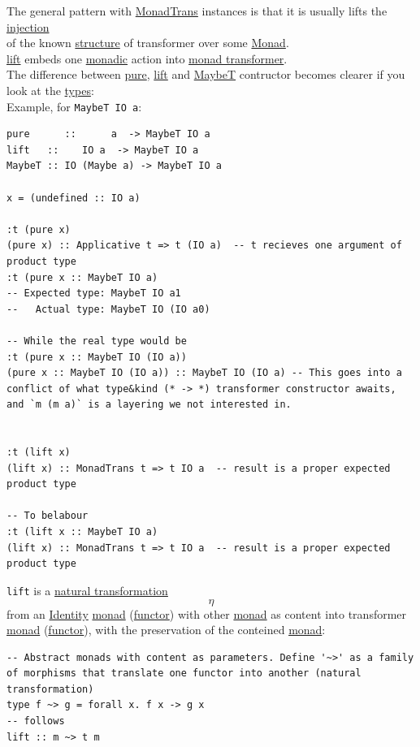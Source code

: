 \documentclass[11pt]{article}
\begin{document}
\begin{enumerate}
\begin{enumerate}
The general pattern with \hyperref[orge3b9a95]{MonadTrans} instances is that it is usually lifts the \hyperref[org50a8f52]{injection}\\
of the known \hyperref[org8051f61]{structure} of transformer over some \hyperref[org86a5d95]{Monad}.\\

\hyperref[org47dee33]{lift} embeds one \hyperref[orgad51197]{monadic} action into \hyperref[orgf5e357d]{monad transformer}.\\

The difference between \hyperref[org1bf8e16]{pure}, \hyperref[org47dee33]{lift} and \hyperref[org9ccf9cb]{MaybeT} contructor becomes clearer if you look at the \hyperref[org4209edd]{types}:\\

Example, for \texttt{MaybeT IO a}:\\
\begin{verbatim}
pure      ::      a  -> MaybeT IO a
lift   ::    IO a  -> MaybeT IO a
MaybeT :: IO (Maybe a) -> MaybeT IO a

x = (undefined :: IO a)

:t (pure x)
(pure x) :: Applicative t => t (IO a)  -- t recieves one argument of product type
:t (pure x :: MaybeT IO a)
-- Expected type: MaybeT IO a1
--   Actual type: MaybeT IO (IO a0)

-- While the real type would be
:t (pure x :: MaybeT IO (IO a))
(pure x :: MaybeT IO (IO a)) :: MaybeT IO (IO a) -- This goes into a conflict of what type&kind (* -> *) transformer constructor awaits, and `m (m a)` is a layering we not interested in.


:t (lift x)
(lift x) :: MonadTrans t => t IO a  -- result is a proper expected product type

-- To belabour
:t (lift x :: MaybeT IO a)
(lift x) :: MonadTrans t => t IO a  -- result is a proper expected product type
\end{verbatim}

\texttt{lift} is a \hyperref[orgc8e9bc9]{natural transformation} $$ \eta $$ from an \hyperref[org9b95fd5]{Identity} \hyperref[org86a5d95]{monad} (\hyperref[orgf2f6841]{functor}) with other \hyperref[org86a5d95]{monad} as content into transformer \hyperref[org86a5d95]{monad} (\hyperref[orgf2f6841]{functor}), with the preservation of the conteined \hyperref[org86a5d95]{monad}:\\
\begin{verbatim}
-- Abstract monads with content as parameters. Define '~>' as a family of morphisms that translate one functor into another (natural transformation)
type f ~> g = forall x. f x -> g x
-- follows
lift :: m ~> t m
\end{verbatim}


\end{enumerate}
\end{enumerate}
\end{document}

